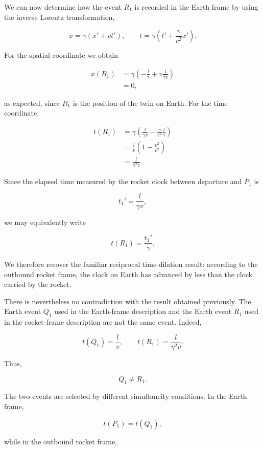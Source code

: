 \documentclass[12pt]{article}
\begin{document}
We can now determine how the event $R_1$ is recorded in the Earth frame by using the
inverse Lorentz transformation,

\[
  x=\gamma(x'+vt'),
  \qquad
  t=\gamma\left(t'+\frac{v}{c^2}x'\right).
\]

For the spatial coordinate we obtain

\begin{align}
  x(R_1)
  &=
  \gamma
  \left(
    -\frac{l}{\gamma}
    +
    v\frac{l}{\gamma v}
  \right)
  \nonumber\\
  &=
  0,
\end{align}

as expected, since $R_1$ is the position of the twin on Earth. For the
time coordinate,

\begin{align}
  t(R_1)
  &=
  \gamma
  \left(
    \frac{l}{\gamma v}
    -
    \frac{v}{c^2}\frac{l}{\gamma}
  \right)
  \nonumber\\
  &=
  \frac{l}{v}
  \left(
    1-\frac{v^2}{c^2}
  \right)
  \nonumber\\
  &=
  \frac{l}{\gamma^2 v}.
\end{align}

Since the elapsed time measured by the rocket clock between departure and $P_1$ is

\[
  t_1'=\frac{l}{\gamma v},
\]

we may equivalently write

\[
  t(R_1)=\frac{t_1'}{\gamma}.
\]

We therefore recover the familiar reciprocal time-dilation result: according to the
outbound rocket frame, the clock on Earth has advanced by less than the clock carried
by the rocket. \par

There is nevertheless no contradiction with the result obtained previously. The
Earth event $Q_1$ used in the Earth-frame description and the Earth event $R_1$ used
in the rocket-frame description are not the same event. Indeed,

\[
  t(Q_1)=\frac{l}{v},
  \qquad
  t(R_1)=\frac{l}{\gamma^2 v}.
\]

Thus,

\[
  Q_1\neq R_1.
\]

The two events are selected by different simultaneity conditions. In the Earth frame,

\[
  t(P_1)=t(Q_1),
\]

while in the outbound rocket frame,
\end{document}
